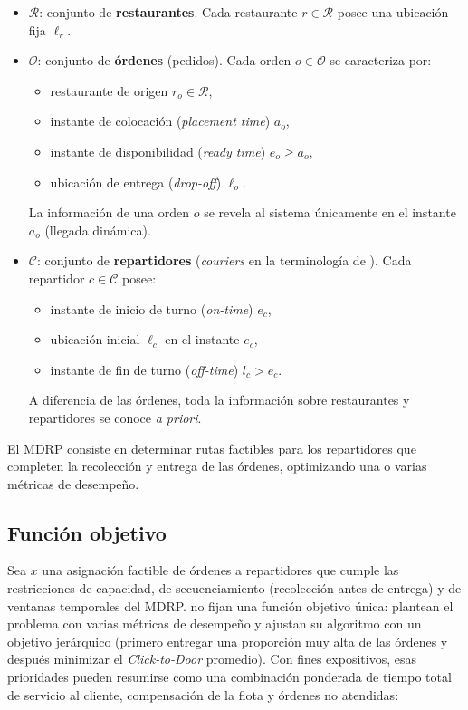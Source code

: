 \documentclass[12pt,letterpaper,oneside]{book}
\begin{document}
	\begin{itemize}
		\item $\mathcal{R}$: conjunto de \textbf{restaurantes}.  Cada restaurante
		      $r \in \mathcal{R}$ posee una ubicación fija $\ell_r$.

		\item $\mathcal{O}$: conjunto de \textbf{órdenes} (pedidos).  Cada orden
		      $o \in \mathcal{O}$ se caracteriza por:
		      \begin{itemize}
		          \item restaurante de origen $r_o \in \mathcal{R}$,
		          \item instante de colocación (\textit{placement time}) $a_o$,
		          \item instante de disponibilidad (\textit{ready time}) $e_o \geq a_o$,
		          \item ubicación de entrega (\textit{drop-off}) $\ell_o$.
		      \end{itemize}
		      La información de una orden $o$ se revela al sistema únicamente en
		      el instante $a_o$ (llegada dinámica).

		\item $\mathcal{C}$: conjunto de \textbf{repartidores} (\textit{couriers} en la
	      terminología de \citet{Reyes2018}).  Cada
		      repartidor $c \in \mathcal{C}$ posee:
		      \begin{itemize}
		          \item instante de inicio de turno (\textit{on-time}) $e_c$,
		          \item ubicación inicial $\ell_c$ en el instante $e_c$,
		          \item instante de fin de turno (\textit{off-time}) $l_c > e_c$.
		      \end{itemize}
		      A diferencia de las órdenes, toda la información sobre restaurantes
		      y repartidores se conoce \textit{a priori}.
	\end{itemize}

	El MDRP consiste en determinar rutas factibles para los repartidores que
	completen la recolección y entrega de las órdenes, optimizando una o varias
	métricas de desempeño.

	\subsection{Función objetivo}

	Sea $x$ una asignación factible de órdenes a repartidores que cumple las
	restricciones de capacidad, de secuenciamiento (recolección antes de
	entrega) y de ventanas temporales del MDRP.  \citet{Reyes2018} no fijan
	una función objetivo única: plantean el problema con varias métricas de
	desempeño y ajustan su algoritmo con un objetivo jerárquico (primero
	entregar una proporción muy alta de las órdenes y después minimizar el
	\textit{Click-to-Door} promedio).  Con fines expositivos, esas
	prioridades pueden resumirse como una combinación ponderada de tiempo
	total de servicio al cliente, compensación de la flota y órdenes no
	atendidas:
\end{document}
